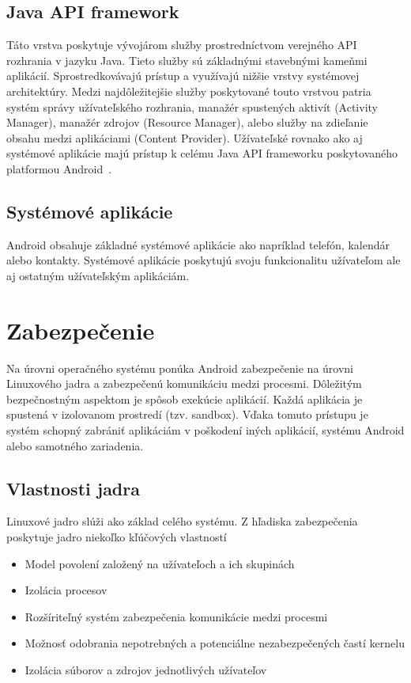 \subsection{Java API framework}
Táto vrstva poskytuje vývojárom služby prostredníctvom verejného API rozhrania v jazyku Java. Tieto služby sú základnými stavebnými kameňmi aplikácií. Sprostredkovávajú prístup a využívajú nižšie vrstvy systémovej architektúry. Medzi najdôležitejšie služby poskytované touto vrstvou patria systém správy užívateľského rozhrania, manažér spustených aktivít (Activity Manager), manažér zdrojov (Resource Manager), alebo služby na zdieľanie obsahu medzi aplikáciami (Content Provider). 
Užívateľské rovnako ako aj systémové aplikácie majú prístup k celému Java API frameworku poskytovaného platformou Android~\cite{PlatformArchitecture}.

\subsection{Systémové aplikácie}
Android obsahuje základné systémové aplikácie ako napríklad telefón, kalendár alebo kontakty. Systémové aplikácie poskytujú svoju funkcionalitu užívateľom ale aj ostatným užívateľským aplikáciám.		


\section{Zabezpečenie}
Na úrovni operačného systému ponúka Android zabezpečenie na úrovni Linuxového jadra a zabezpečenú komunikáciu medzi procesmi.  Dôležitým bezpečnostným aspektom je spôsob exekúcie aplikácií. Každá aplikácia je spustená v izolovanom prostredí (tzv. sandbox). Vďaka tomuto prístupu je systém schopný zabrániť aplikáciám v poškodení iných aplikácií, systému Android alebo samotného zariadenia.

\subsection{Vlastnosti jadra}
Linuxové jadro slúži ako základ celého systému. Z hľadiska zabezpečenia poskytuje jadro niekoľko kľúčových vlastností 


\begin{itemize}
	\item Model povolení založený na užívateľoch a ich skupinách
	\item Izolácia procesov
	\item Rozšíriteľný systém zabezpečenia komunikácie medzi procesmi
	\item Možnosť odobrania nepotrebných a potenciálne nezabezpečených častí kernelu
	\item Izolácia súborov a zdrojov jednotlivých užívateľov
\end{itemize}

